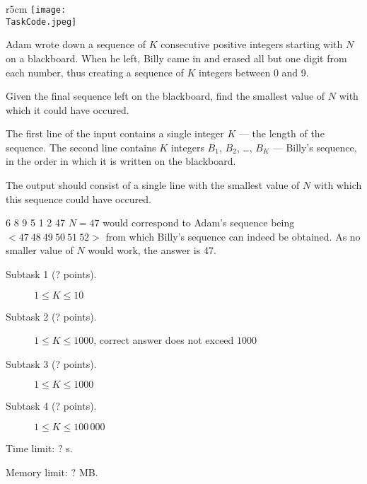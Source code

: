 \documentclass{boi2014}
\renewcommand{\TaskCode}{sequence}
\begin{document}
    \begin{wrapfigure}{r}{5cm}
		\texttt{[image: \\TaskCode.jpeg]}
	\end{wrapfigure}

    Adam wrote down a sequence of $K$ consecutive positive integers starting
    with $N$ on a blackboard. When he left, Billy came in and erased all but one
    digit from each number, thus creating a sequence of $K$ integers between 0
    and 9.

    \Task

    Given the final sequence left on the blackboard, find the smallest
    value of $N$ with which it could have occured.

    \Input

    The first line of the input contains a single integer $K$ --- the length of
    the sequence. The second line contains $K$ integers $B_1$, $B_2$, \dots,
    $B_K$ --- Billy's sequence, in the order in which it is written on the
    blackboard.

    \Output

    The output should consist of a single line with the smallest value of
    $N$ with which this sequence could have occured.

    \Example

    \example
    {
        6 8 9 5 1 2
    }
    {
        47
    }
    {
        $N = 47$ would correspond to Adam's sequence
        being $<47\ 48\ 49\ 50\ 51\ 52>$ from which Billy's sequence
        can indeed be obtained. As no smaller value of $N$
        would work, the answer is 47.
    }

\Scoring

\begin{description}
    \item[Subtask 1 (? points).] $1 \le K \le 10$
    \item[Subtask 2 (? points).] $1 \le K \le 1000$, correct
        answer does not exceed $1000$
    \item[Subtask 3 (? points).] $1 \le K \le 1000$
    \item[Subtask 4 (? points).] $1 \le K \le 100\,000$
\end{description}

\Constraints

Time limit: $?$ s.

Memory limit: $?$ MB.
\end{document}
